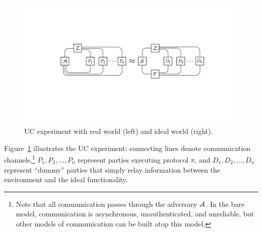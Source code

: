 \begin{figure}
  \centering
  \includegraphics[width=\linewidth]{graphics/uc-experiment}
  \caption{UC experiment with real world (left) and ideal world (right).}
  \label{fig:uc-experiment}
\end{figure}

Figure~\ref{fig:uc-experiment} illustrates the UC experiment: connecting lines
denote communication channels,\footnote{Note that all communication passes
  through the adversary $\mathcal{{A}}$. In the bare model, communication is
  asynchronous, unauthenticated, and unreliable, but other models of
  communication can be built atop this model.} $P_1, P_2, \ldots, P_n$ represent
parties executing protocol $\pi$, and $D_1, D_2, \ldots, D_n$ represent ``dummy''
parties that simply relay information between the environment and the ideal
functionality.


